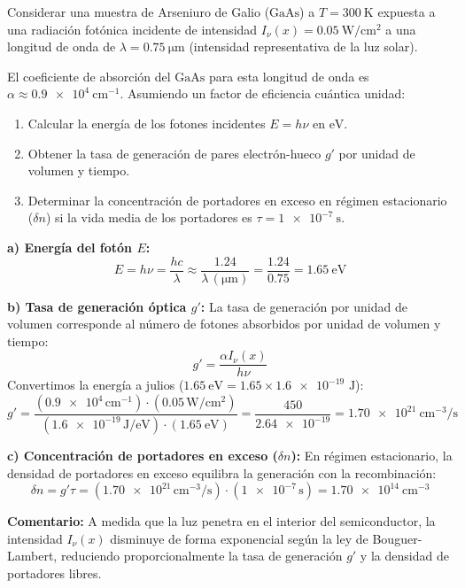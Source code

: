 \begin{ejemplo}
Considerar una muestra de Arseniuro de Galio ($\text{GaAs}$) a $T = \SI{300}{\kelvin}$ expuesta a una radiación fotónica incidente de intensidad $I_\nu(x) = \SI{0.05}{\watt\per\cm^2}$ a una longitud de onda de $\lambda = \SI{0.75}{\micro\meter}$ (intensidad representativa de la luz solar).

El coeficiente de absorción del $\text{GaAs}$ para esta longitud de onda es $\alpha \approx \SI{0.9e4}{\cm^{-1}}$. Asumiendo un factor de eficiencia cuántica unidad:
\begin{enumerate}[label=\alph*)]
    \item Calcular la energía de los fotones incidentes $E = h\nu$ en $\si{\eV}$.
    \item Obtener la tasa de generación de pares electrón-hueco $g'$ por unidad de volumen y tiempo.
    \item Determinar la concentración de portadores en exceso en régimen estacionario ($\delta n$) si la vida media de los portadores es $\tau = \SI{1e-7}{\second}$.
\end{enumerate}

\tcblower

\textbf{a) Energía del fotón $E$:}
\[
E = h\nu = \frac{hc}{\lambda} \approx \frac{1.24}{\lambda \, (\si{\micro\meter})} = \frac{1.24}{0.75} = \SI{1.65}{\eV}
\]

\textbf{b) Tasa de generación óptica $g'$:}
La tasa de generación por unidad de volumen corresponde al número de fotones absorbidos por unidad de volumen y tiempo:
\[
g' = \frac{\alpha I_\nu(x)}{h\nu}
\]
Convertimos la energía a julios ($\SI{1.65}{\eV} = 1.65 \times \num{1.6e-19} \text{ J}$):
\[
g' = \frac{(\num{0.9e4} \, \si{\cm^{-1}}) \cdot (\num{0.05} \, \si{\watt\per\cm^2})}{(\num{1.6e-19} \, \si{\joule\per\eV}) \cdot (\SI{1.65}{\eV})} = \frac{450}{\num{2.64e-19}} = \SI{1.70e21}{\cm^{-3}\per\second}
\]

\textbf{c) Concentración de portadores en exceso ($\delta n$):}
En régimen estacionario, la densidad de portadores en exceso equilibra la generación con la recombinación:
\[
\delta n = g' \tau = (\num{1.70e21} \, \si{\cm^{-3}\per\second}) \cdot (\num{1e-7} \, \si{\second}) = \SI{1.70e14}{\cm^{-3}}
\]

\textbf{Comentario:} A medida que la luz penetra en el interior del semiconductor, la intensidad $I_\nu(x)$ disminuye de forma exponencial según la ley de Bouguer-Lambert, reduciendo proporcionalmente la tasa de generación $g'$ y la densidad de portadores libres.
\end{ejemplo}

